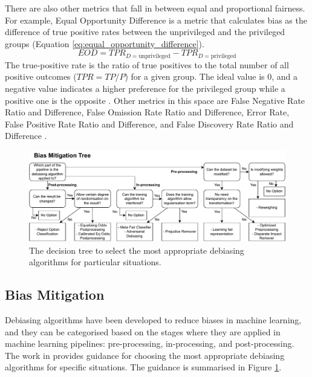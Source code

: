 \documentclass[sigconf]{acmart}
\begin{document}
	There are also other metrics that fall in between equal and proportional fairness. For example, Equal Opportunity Difference \cite{ibmaif3602022doc,bellamy2018ai} is a metric that calculates bias as the difference of true positive rates between the unprivileged and the privileged groups (Equation \ref{eq:equal_opportunity_difference}). 
	\begin{equation} \label{eq:equal_opportunity_difference}
		EOD = TPR_{D = \text{unprivileged}} - TPR_{D = \text{privileged}}	
	\end{equation}
	The true-positive rate is the ratio of true positives to the total number of all positive outcomes ($TPR=TP/P$) for a given group. The ideal value is 0, and a negative value indicates a higher preference for the privileged group while a positive one is the opposite \cite{ibmaif3602022doc,bellamy2018ai}. Other metrics in this space are False Negative Rate Ratio and Difference, False Omission Rate Ratio and Difference, Error Rate, False Positive Rate Ratio and Difference, and False Discovery Rate Ratio and Difference \cite{mahoney2020ai,ibmaif3602022guidance}.
	
	
	\begin{figure}
		\includegraphics[width=\linewidth]{figures/wizard-debiasing}
		\caption{The decision tree to select the most appropriate debiasing algorithms for particular situations.}
		\label{fig:wizard-debiasing}
	\end{figure}
	
	\subsection{Bias Mitigation}
	\label{sec:bias_mitigation}
	
	Debiasing algorithms have been developed to reduce biases in machine learning, and they can be categorised based on the stages where they are applied in machine learning pipelines: pre-processing, in-processing, and post-processing. The work in  \cite{mahoney2020ai,ibmaif3602022guidance} provides guidance for choosing the most appropriate debiasing algorithms for specific situations. The guidance is summarised in Figure \ref{fig:wizard-debiasing}.
	
\end{document}
